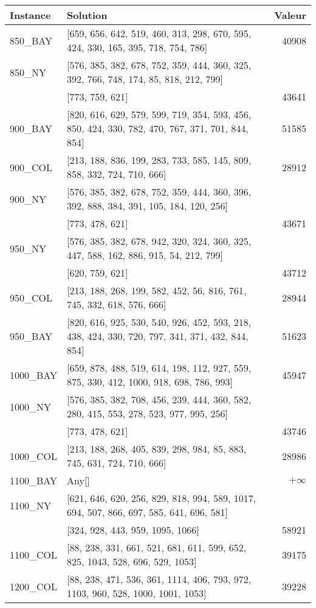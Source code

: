 \documentclass[main.tex]{subfiles}
\begin{document}
\begin{center}
\renewcommand{\arraystretch}{1.4} 
\begin{tabular}{llr}\hline
\textbf{Instance} & \textbf{Solution} & \textbf{Valeur} \\\hline

850\_BAY & [659, 656, 642, 519, 460, 313, 298, 670, 595, 424, 330, 165, 395, 718, 754, 786] & 40908\\
850\_NY & [576, 385, 382, 678, 752, 359, 444, 360, 325, 392, 766, 748, 174, 85, 818, 212, 799]\\ & [773, 759, 621] & 43641\\
900\_BAY & [820, 616, 629, 579, 599, 719, 354, 593, 456, 850, 424, 330, 782, 470, 767, 371, 701, 844, 854] & 51585\\
900\_COL & [213, 188, 836, 199, 283, 733, 585, 145, 809, 858, 332, 724, 710, 666] & 28912\\
900\_NY & [576, 385, 382, 678, 752, 359, 444, 360, 396, 392, 888, 384, 391, 105, 184, 120, 256]\\ & [773, 478, 621] & 43671\\
950\_NY & [576, 385, 382, 678, 942, 320, 324, 360, 325, 447, 588, 162, 886, 915, 54, 212, 799]\\ & [620, 759, 621] & 43712\\
950\_COL & [213, 188, 268, 199, 582, 452, 56, 816, 761, 745, 332, 618, 576, 666] & 28944\\
950\_BAY & [820, 616, 925, 530, 540, 926, 452, 593, 218, 438, 424, 330, 720, 797, 341, 371, 432, 844, 854] & 51623\\
1000\_BAY & [659, 878, 488, 519, 614, 198, 112, 927, 559, 875, 330, 412, 1000, 918, 698, 786, 993] & 45947\\
1000\_NY & [576, 385, 382, 708, 456, 239, 444, 360, 582, 280, 415, 553, 278, 523, 977, 995, 256]\\ & [773, 478, 621] & 43746\\
1000\_COL & [213, 188, 268, 405, 839, 298, 984, 85, 883, 745, 631, 724, 710, 666] & 28986\\
1100\_BAY & Any[] & $+\infty$\\
1100\_NY & [621, 646, 620, 256, 829, 818, 994, 589, 1017, 694, 507, 866, 697, 585, 641, 696, 581]\\ & [324, 928, 443, 959, 1095, 1066] & 58921\\
1100\_COL & [88, 238, 331, 661, 521, 681, 611, 599, 652, 825, 1043, 528, 696, 529, 1053] & 39175\\
1200\_COL & [88, 238, 471, 536, 361, 1114, 406, 793, 972, 1103, 960, 528, 1000, 1001, 1053] & 39228\\

\end{tabular}
\end{center}
\end{document}
